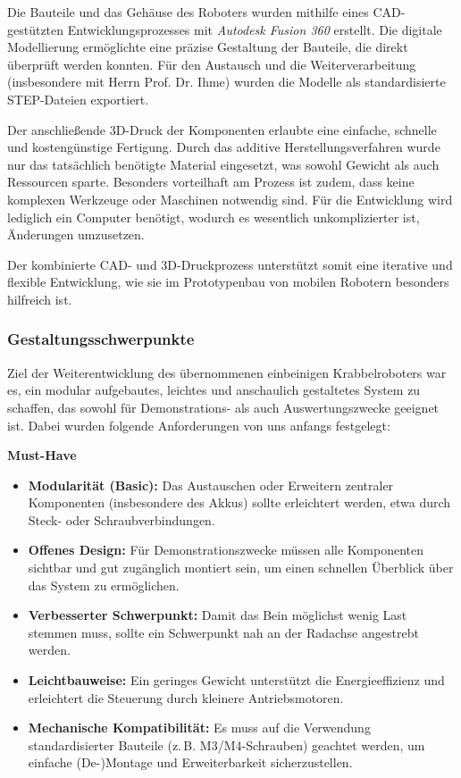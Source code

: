 Die Bauteile und das Gehäuse des Roboters wurden mithilfe eines CAD-gestützten Entwicklungsprozesses mit \emph{Autodesk Fusion 360} \cite{fusion360} erstellt. Die digitale Modellierung ermöglichte eine präzise Gestaltung der Bauteile, die direkt überprüft werden konnten. Für den Austausch und die Weiterverarbeitung (insbesondere mit Herrn Prof. Dr. Ihme) wurden die Modelle als standardisierte STEP-Dateien exportiert.

Der anschließende 3D-Druck der Komponenten erlaubte eine einfache, schnelle und kostengünstige Fertigung. Durch das additive Herstellungsverfahren wurde nur das tatsächlich benötigte Material eingesetzt, was sowohl Gewicht als auch Ressourcen sparte. Besonders vorteilhaft am Prozess ist zudem, dass keine komplexen Werkzeuge oder Maschinen notwendig sind. Für die Entwicklung wird lediglich ein Computer benötigt, wodurch es wesentlich unkomplizierter ist, Änderungen umzusetzen.

Der kombinierte CAD- und 3D-Druckprozess unterstützt somit eine iterative und flexible Entwicklung, wie sie im Prototypenbau von mobilen Robotern besonders hilfreich ist.

\subsubsection{Gestaltungsschwerpunkte}

Ziel der Weiterentwicklung des übernommenen einbeinigen Krabbelroboters war es, ein modular aufgebautes, leichtes und anschaulich gestaltetes System zu schaffen, das sowohl für Demonstrations- als auch Auswertungszwecke geeignet ist. Dabei wurden folgende Anforderungen von uns anfangs festgelegt:

\textbf{Must-Have}
\begin{itemize}
  \item \textbf{Modularität (Basic):} Das Austauschen oder Erweitern zentraler Komponenten (insbesondere des Akkus) sollte erleichtert werden, etwa durch Steck- oder Schraubverbindungen.
  \item \textbf{Offenes Design:} Für Demonstrationszwecke müssen alle Komponenten sichtbar und gut zugänglich montiert sein, um einen schnellen Überblick über das System zu ermöglichen.
  \item \textbf{Verbesserter Schwerpunkt:} Damit das Bein möglichst wenig Last stemmen muss, sollte ein Schwerpunkt nah an der Radachse angestrebt werden.
  \item \textbf{Leichtbauweise:} Ein geringes Gewicht unterstützt die Energieeffizienz und erleichtert die Steuerung durch kleinere Antriebsmotoren.
  \item \textbf{Mechanische Kompatibilität:} Es muss auf die Verwendung standardisierter Bauteile (z.\,B. M3/M4-Schrauben) geachtet werden, um einfache (De-)Montage und Erweiterbarkeit sicherzustellen.
\end{itemize}

